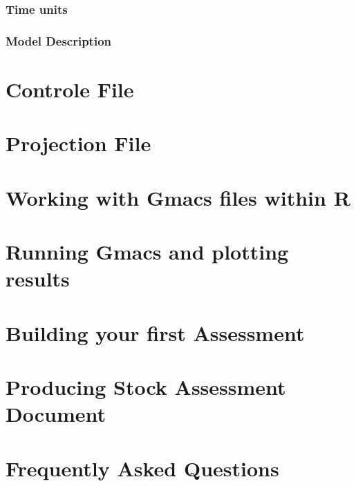 \documentclass[
]{book}
\begin{document}
\hypertarget{time-units}{%
\subsection{Time units}\label{time-units}}

\hypertarget{model-description}{%
\subsection{Model Description}\label{model-description}}

\hypertarget{ctr-file}{%
\chapter{Controle File}\label{ctr-file}}

\hypertarget{Project}{%
\chapter{Projection File}\label{Project}}

\hypertarget{Rgmacs}{%
\chapter{Working with Gmacs files within R}\label{Rgmacs}}

\hypertarget{run-plot}{%
\chapter{Running Gmacs and plotting results}\label{run-plot}}

\hypertarget{first-gmacs}{%
\chapter{Building your first Assessment}\label{first-gmacs}}

\hypertarget{sad}{%
\chapter{Producing Stock Assessment Document}\label{sad}}

\hypertarget{faq}{%
\chapter{Frequently Asked Questions}\label{faq}}

  
\end{document}
